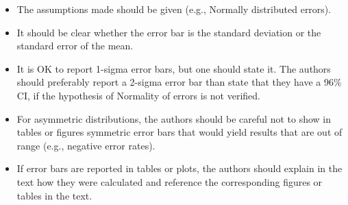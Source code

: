 \documentclass{article}
\theoremstyle{definition}
\theoremstyle{remark}
\theoremstyle{remark}
\begin{document}
\begin{enumerate}
\begin{itemize}
        \item The assumptions made should be given (e.g., Normally distributed errors).
        \item It should be clear whether the error bar is the standard deviation or the standard error of the mean.
        \item It is OK to report 1-sigma error bars, but one should state it. The authors should preferably report a 2-sigma error bar than state that they have a 96\% CI, if the hypothesis of Normality of errors is not verified.
        \item For asymmetric distributions, the authors should be careful not to show in tables or figures symmetric error bars that would yield results that are out of range (e.g., negative error rates).
        \item If error bars are reported in tables or plots, the authors should explain in the text how they were calculated and reference the corresponding figures or tables in the text.
    \end{itemize}


\end{enumerate}
\end{document}
